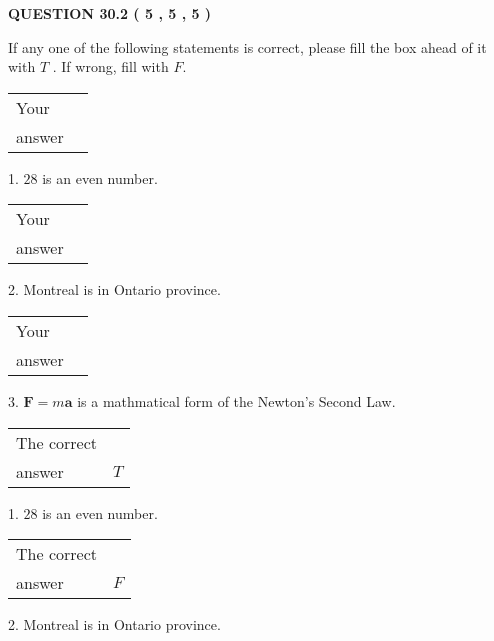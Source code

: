 \documentclass[12pt]{article}
\begin{document}
   
  
\vspace{0.2in}
  
{\textbf{\Large{QUESTION
30.2 
 (           5 ,           5 ,           5 )
}}}
  
  
If any one of the following statements is correct, please fill the box ahead of it with $T$ .
If wrong, fill with $F$.
 
\noindent\begin{tabular}{|l|l|}\hline Your&\hspace{.2in} \\ answer&\hspace{.2in} \\ \hline \end{tabular}
1. $ %
28$ is an  %
even number.
 
\noindent\begin{tabular}{|l|l|}\hline Your&\hspace{.2in} \\ answer&\hspace{.2in} \\ \hline \end{tabular}
2.  %
Montreal is in  %
Ontario province.
 
\noindent\begin{tabular}{|l|l|}\hline Your&\hspace{.2in} \\ answer&\hspace{.2in} \\ \hline \end{tabular}
3.  %
$\mathbf{F}=m\mathbf{a}$ is a mathmatical form of
the Newton's Second Law.
 
 
 
\noindent{}
 
 

 
\noindent\begin{tabular}{|l|l|}\hline The correct & \\
          answer &  %
$T$ \\ \hline \end{tabular}
1. $ %
28$ is an  %
even number.
 
\noindent\begin{tabular}{|l|l|}\hline The correct & \\
          answer &  %
$F$ \\ \hline \end{tabular}
2.  %
Montreal is in  %
Ontario province.
 
\end{document}

